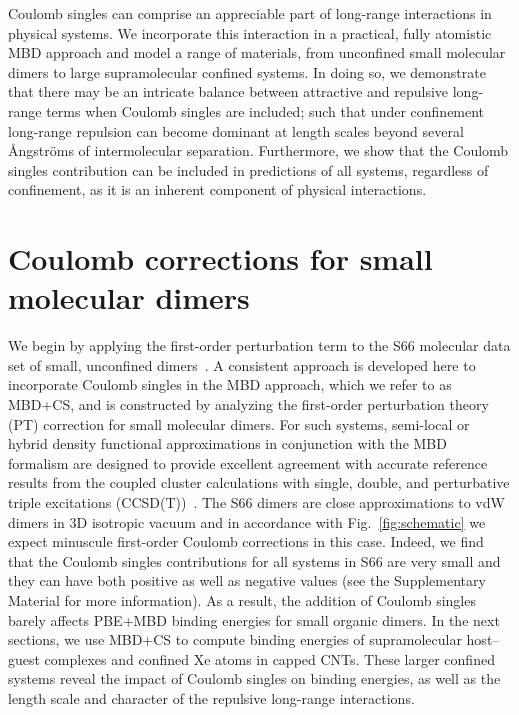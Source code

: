 \documentclass[aps,prl,groupaddress, twocolumn]{revtex4-1}  %
\begin{document}
Coulomb singles can comprise an appreciable part %
of long-range interactions in physical systems. We incorporate this interaction in a practical, fully atomistic MBD approach and model a range of materials, from unconfined small molecular dimers to large supramolecular confined systems. In doing so, we demonstrate that there may be an intricate balance between attractive and repulsive long-range terms when Coulomb singles are included; such that under confinement long-range repulsion can become dominant at length scales beyond several \r{A}ngstr\"{o}ms of intermolecular separation. %
Furthermore, we show that the Coulomb singles contribution can be included in predictions of all systems, regardless of confinement, as it is an inherent component of physical interactions. 

\section*{Coulomb corrections for small molecular dimers}
We begin by applying the first-order perturbation term to the S66 molecular data set of small, unconfined dimers~\cite{s66X8_database}. A consistent approach is developed here to incorporate Coulomb singles in the MBD approach, which we refer to as MBD+CS, and is constructed by analyzing the first-order perturbation theory (PT) correction for small molecular dimers.
For such systems, semi-local or hybrid density functional approximations in conjunction with the MBD formalism are designed to provide excellent agreement with accurate reference results from the coupled cluster calculations with single, double, and perturbative triple excitations (CCSD(T))~\cite{Tkatchenko2012}.  %
The S66 dimers are close approximations to vdW dimers in 3D isotropic vacuum and in accordance with Fig.~\ref{fig:schematic} we expect minuscule first-order Coulomb corrections in this case.
Indeed, we find that the Coulomb singles contributions for all systems in S66 are very small and they can have both positive as well as negative values (see the Supplementary Material for more information). As a result, the addition of Coulomb singles barely affects PBE+MBD binding energies for small organic dimers.
In the next sections, we use MBD+CS to compute binding energies of supramolecular host--guest complexes and confined Xe atoms in capped CNTs. These larger confined systems reveal the impact of Coulomb singles on binding energies, as well as the length scale and character of the repulsive long-range interactions.
\end{document}
